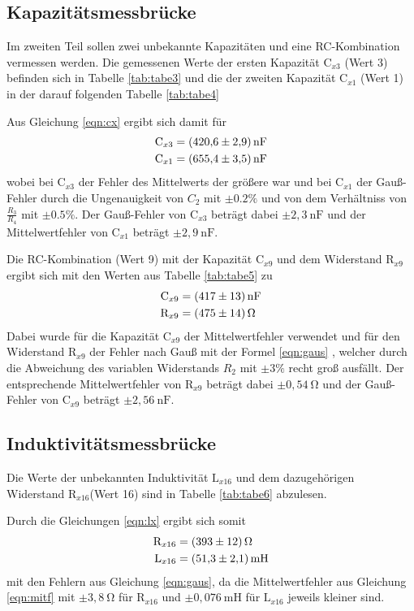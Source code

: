 \subsection{Kapazitätsmessbrücke}
Im zweiten Teil sollen zwei unbekannte Kapazitäten und eine RC-Kombination
vermessen werden. Die gemessenen Werte der ersten Kapazität $ \text{C}_{x3} $ (Wert 3) befinden
sich in Tabelle \ref{tab:tabe3} und die der zweiten Kapazität $ \text{C}_{x1} $
(Wert 1) in der
darauf folgenden Tabelle \ref{tab:tabe4}


\noindent Aus Gleichung \ref{eqn:cx}
ergibt sich damit für
\begin{align*}
  \text{C}_{x3} &= \SI{420.6 (29)}{\nano\farad} \\
  \text{C}_{x1} &= \SI{655.4 (35)}{\nano\farad}
\end{align*}
\noindent wobei bei $ \text{C}_{x3} $ der Fehler des Mittelwerts der größere war und bei
$ \text{C}_{x1} $ der Gauß-Fehler durch die Ungenauigkeit von $C_2$ mit $ \pm 0.2
\% $ und von dem Verhältniss von $ \frac{R_3}{R_4} $ mit $ \pm 0.5 \% $.
Der Gauß-Fehler von $ \text{C}_{x3} $ beträgt
dabei $ \pm 2,3 \: \si{\nano\farad} $ und der Mittelwertfehler von $ \text{C}_{x1} $
beträgt $ \pm 2,9 \: \si{\nano\farad} $.


\noindent Die RC-Kombination (Wert 9) mit der Kapazität $ \text{C}_{x9} $ und dem
Widerstand $ \text{R}_{x9} $ ergibt sich
mit den Werten aus Tabelle \ref{tab:tabe5} zu
\begin{align*}
  \text{C}_{x9} &= \SI{417 (13)}{\nano\farad} \\
  \text{R}_{x9} &= \SI{475 (14)}{\ohm}
\end{align*}
\noindent Dabei wurde für die Kapazität $ \text{C}_{x9} $ der Mittelwertfehler verwendet und
für den Widerstand $ \text{R}_{x9} $ der Fehler nach Gauß mit der Formel \ref{eqn:gaus}
, welcher durch die Abweichung des variablen Widerstands $R_2$ mit $ \pm 3 \% $
recht groß ausfällt. Der entsprechende Mittelwertfehler von $ \text{R}_{x9} $
beträgt dabei $ \pm 0,54 \: \si{\ohm} $ und der Gauß-Fehler von $ \text{C}_{x9} $ beträgt
$ \pm 2,56 \: \si{\nano\farad} $.


\subsection{Induktivitätsmessbrücke}

Die Werte der unbekannten Induktivität $ \text{L}_{x16} $ und dem dazugehörigen
Widerstand $ \text{R}_{x16} $(Wert 16) sind in Tabelle
\ref{tab:tabe6} abzulesen.

\noindent Durch die Gleichungen \ref{eqn:lx}
ergibt sich somit
\begin{align*}
  \text{R}_{x16} &= \SI{393 (12)}{\ohm} \\
  \text{L}_{x16} &= \SI{51.3 (21)}{\milli\henry}
\end{align*}
\noindent mit den Fehlern aus Gleichung \ref{eqn:gaus}, da die Mittelwertfehler aus Gleichung
\ref{eqn:mitf} mit
$ \pm 3,8 \: \si{\ohm} $ für $ \text{R}_{x16} $ und $ \pm 0,076 \: \si{\milli\henry} $
für $ \text{L}_{x16} $ jeweils kleiner sind.

